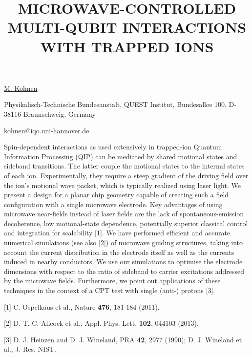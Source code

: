 \title{MICROWAVE-CONTROLLED MULTI-QUBIT INTERACTIONS WITH TRAPPED IONS}

\underline{M. Kohnen} 

{\normalsize{\vspace{-4mm}}
Physikalisch-Technische Bundesanstalt,
QUEST Institut,
Bundesallee 100,
D-38116 Braunschweig,
Germany

\email kohnen@iqo.uni-hannover.de}

Spin-dependent interactions as used extensively in trapped-ion Quantum Information Processing (QIP) can be mediated by shared motional states and sideband transitions. The latter couple the motional states to the internal states of each ion. Experimentally, they require a steep gradient of the driving field over the ion's motional wave packet, which is typically realized using laser light.
We present a design for a planar chip geometry capable of creating such a field configuration with a single microwave electrode. Key advantages of using microwave near-fields instead of laser fields are the lack of spontaneous-emission decoherence, low motional-state dependence, potentially superior classical control and integration for scalability [1].
We have performed efficient and accurate numerical simulations (see also [2]) of microwave guiding structures, taking into account the current distribution in the electrode itself as well as the currents induced in nearby conductors. We use our simulations to optimise the electrode dimensions with respect to the ratio of sideband to carrier excitations addressed by the microwave fields.
Furthermore, we point out applications of these techniques in the context of a CPT test with single (anti-) protons [3].

{\normalsize
[1] C. Ospelkaus et al., Nature \textbf{476}, 181-184 (2011).
\vsp

[2] D. T. C. Allcock et al., Appl. Phys. Lett. \textbf{102}, 044103 (2013).
\vsp

[3] D. J. Heinzen and D. J. Wineland, PRA \textbf{42}, 2977 (1990); D. J. Wineland et al., J. Res. NIST.
}

\vspace{\baselineskip}
